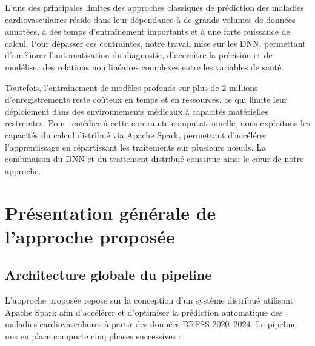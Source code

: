 \documentclass[12pt,a4paper]{report}
\begin{document}
L'une des principales limites des approches classiques de prédiction des maladies
cardiovasculaires réside dans leur dépendance à de grands volumes de données
annotées, à des temps d'entraînement importants et à une forte puissance de calcul.
Pour dépasser ces contraintes, notre travail mise sur les \acs{DNN}, permettant
d'améliorer l'automatisation du diagnostic, d'accroître la précision et de modéliser
des relations non linéaires complexes entre les variables de santé.

Toutefois, l'entraînement de modèles profonds sur plus de 2 millions d'enregistrements
reste coûteux en temps et en ressources, ce qui limite leur déploiement dans des
environnements médicaux à capacités matérielles restreintes. Pour remédier à cette
contrainte computationnelle, nous exploitons les capacités du calcul distribué via
Apache Spark, permettant d'accélérer l'apprentissage en répartissant les traitements
sur plusieurs nœuds. La combinaison du \acs{DNN} et du traitement distribué constitue
ainsi le c\oe{}ur de notre approche.

\section{Présentation générale de l'approche proposée}

\subsection{Architecture globale du pipeline}

L'approche proposée repose sur la conception d'un système distribué utilisant
Apache Spark afin d'accélérer et d'optimiser la prédiction automatique des maladies
cardiovasculaires à partir des données \acs{BRFSS} 2020--2024. Le pipeline mis en
place comporte cinq phases successives \cite{provost2013} :
\end{document}
